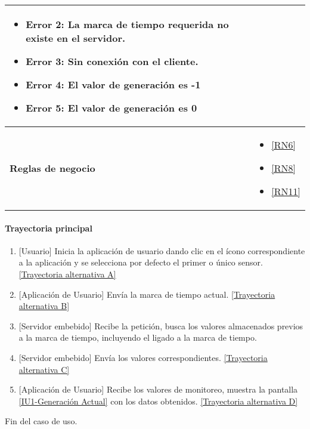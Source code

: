 \begin{longtable}{|J{5cm}|J{10.3cm}|}
\begin{itemize}
			\item \label{CUU1.2:Error2} Error 2: La marca de tiempo requerida no existe en el servidor.
		    \item \label{CUU1.2:Error3} Error 3: Sin conexión con el cliente.
		    \item \label{CUU1.2:Error4} Error 4: El valor de generación es -1
		    \item \label{CUU1.2:Error5} Error 5: El valor de generación es 0
		\end{itemize} \\ \hline
	\textbf{Reglas de negocio} & 
		\begin{itemize}
		    \item \ref{RN6}
			\item \ref{RN8}
			\item \ref{RN11}
		\end{itemize} \\ \hline
\end{longtable}

\paragraph{Trayectoria principal}
    \label{SUB-U-CU1.2:TP}
	\begin{enumerate}
	    \item {[Usuario]} Inicia la aplicación de usuario dando clic en el ícono correspondiente a la aplicación y se selecciona por defecto el primer o único sensor. \hyperref[SUB-U-CU1.2:TA]{[Trayectoria alternativa A]}
	    \item {[Aplicación de Usuario]} Envía la marca de tiempo actual. \hyperref[SUB-U-CU1.2:TB]{[Trayectoria alternativa B]} 
	    \item {[Servidor embebido]} Recibe la petición, busca los valores almacenados previos a la marca de tiempo, incluyendo el ligado a la marca de tiempo.
	    \item {[Servidor embebido]} Envía los valores correspondientes. \hyperref[SUB-U-CU1.2:TC]{[Trayectoria alternativa C]} 
	    \item {[Aplicación de Usuario]} Recibe los valores de monitoreo, muestra la pantalla \hyperref[fig:monitoreo]{[IU1-Generación Actual]} con los datos obtenidos. \hyperref[SUB-U-CU1.2:TD]{[Trayectoria alternativa D]}
	\end{enumerate}
	Fin del caso de uso.

